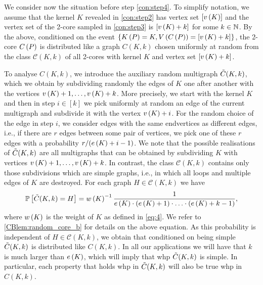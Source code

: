 We consider now the situation before step \ref{con:step4}. To simplify notation, we assume that the kernel $K$ revealed in \ref{con:step2} has vertex set $[v\left({K}\right)]$ and the vertex set of the 2-core sampled in \ref{con:step3} is $[v\left({K}\right)+k]$ for some $k\in\mathbb{N}$. By the above, conditioned on the event $\left\{K\left(P\right)=K, V\left(C\left(P\right)\right)=\left[v\left({K}\right)+k\right]\right\}$, the 2-core $C\left(P\right)$ is distributed like a graph $C(K,k)$ chosen uniformly at random from the class $\mathcal{C}(K,k)$ of all 2-cores with kernel $K$ and vertex set $\left[v\left({K}\right)+k\right]$.

To analyse $C(K,k)$, we introduce the auxiliary random multigraph $\Tilde{C}(K,k)$, which we obtain by subdividing randomly the edges of $K$ one after another with the vertices $v\left({K}\right)+1, \ldots, v\left({K}\right)+k$. More precisely, we start with the kernel $K$ and then in step $i\in [k]$ we pick uniformly at random an edge of the current multigraph and subdivide it with the vertex $v\left({K}\right)+i$. For the random choice of the edge in step $i$, we consider edges with the same endvertices as different edges, i.e., if there are $r$ edges between some pair of vertices, we pick one of these $r$ edges with a probability $r/(e\left({K}\right)+i-1)$. We note that the possible realisations of $\Tilde{C}(K,k)$ are all multigraphs that can be obtained by subdividing $K$ with vertices $v\left({K}\right)+1, \ldots, v\left({K}\right)+k$. In contrast, the class $\mathcal{C}(K,k)$ contains only those subdivisions which are simple graphs, i.e., in which all loops and multiple edges of $K$ are destroyed. For each graph $H\in\mathcal{C}(K,k)$ we have 
\begin{align*}
    \mathbb{P}\left[\Tilde{C}(K,k)=H\right]=w\left(K\right)^{-1}\frac{1}{e\left({K}\right)\cdot \left(e\left({K}\right)+1\right)\cdot\ldots\cdot \left(e\left({K}\right)+k-1\right)},
\end{align*}
where $w\left(K\right)$ is the weight of $K$ as defined in \eqref{eq:4}. We refer to \ref{CBlem:random_core_b} for details on the above equation. As this probability is independent of $H\in\mathcal{C}(K,k)$, we obtain that conditioned on being simple $\Tilde{C}(K,k)$ is distributed like $C(K,k)$. In all our applications we will have that $k$ is much larger than $e\left({K}\right)$, which will imply that whp $\Tilde{C}(K,k)$ is simple. In particular, each property that holds whp in $\Tilde{C}(K,k)$ will also be true whp in $C(K,k)$.

